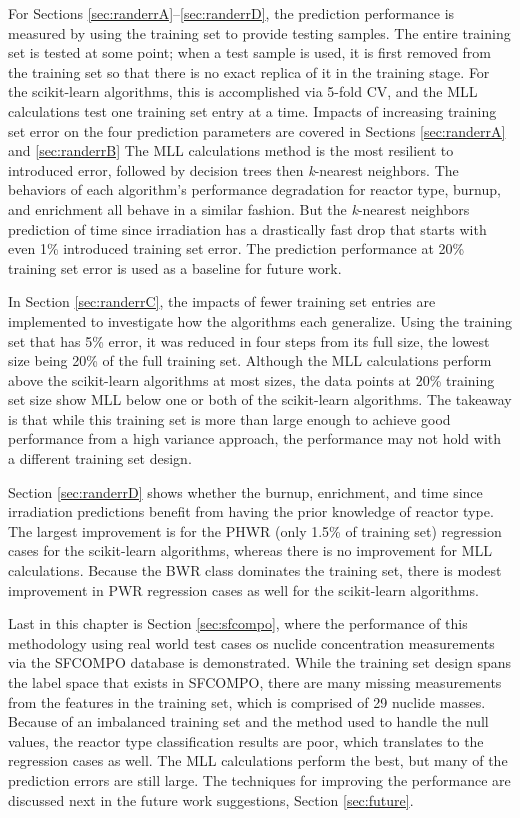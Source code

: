For Sections \ref{sec:randerrA}--\ref{sec:randerrD}, the prediction performance
is measured by using the training set to provide testing samples. The entire
training set is tested at some point; when a test sample is used, it is first
removed from the training set so that there is no exact replica of it in the
training stage. For the scikit-learn algorithms, this is accomplished via
5-fold \gls{CV}, and the \gls{MLL} calculations test one training set entry at
a time.  Impacts of increasing training set error on the four prediction
parameters are covered in Sections \ref{sec:randerrA} and \ref{sec:randerrB}
The \gls{MLL} calculations method is the most resilient to introduced error,
followed by decision trees then \textit{k}-nearest neighbors. The behaviors of
each algorithm's performance degradation for reactor type, burnup, and
enrichment all behave in a similar fashion. But the \textit{k}-nearest
neighbors prediction of time since irradiation has a drastically fast drop that
starts with even 1\% introduced training set error. The prediction performance
at 20\% training set error is used as a baseline for future work. 

In Section \ref{sec:randerrC}, the impacts of fewer training set entries are
implemented to investigate how the algorithms each generalize. Using the
training set that has 5\% error, it was reduced in four steps from its full
size, the lowest size being 20\% of the full training set. Although the
\gls{MLL} calculations perform above the scikit-learn algorithms at most sizes,
the data points at 20\% training set size show \gls{MLL} below one or both of
the scikit-learn algorithms. The takeaway is that while this training set is
more than large enough to achieve good performance from a high variance
approach, the performance may not hold with a different training set design. 

Section \ref{sec:randerrD} shows whether the burnup, enrichment, and time since
irradiation predictions benefit from having the prior knowledge of reactor
type.  The largest improvement is for the \gls{PHWR} (only 1.5\% of training
set) regression cases for the scikit-learn algorithms, whereas there is no
improvement for \gls{MLL} calculations. Because the \gls{BWR} class dominates
the training set, there is modest improvement in \gls{PWR} regression cases as
well for the scikit-learn algorithms.

Last in this chapter is Section \ref{sec:sfcompo}, where the performance of
this methodology using real world test cases os nuclide concentration
measurements via the \gls{SFCOMPO} database is demonstrated.  While the
training set design spans the label space that exists in \gls{SFCOMPO}, there
are many missing measurements from the features in the training set, which is
comprised of 29 nuclide masses.  Because of an imbalanced training set and the
method used to handle the null values, the reactor type classification results
are poor, which translates to the regression cases as well.  The \gls{MLL}
calculations perform the best, but many of the prediction errors are still
large. The techniques for improving the performance are discussed next in the
future work suggestions, Section \ref{sec:future}.


